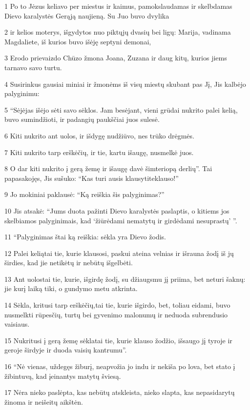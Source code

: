 \par 1 Po to Jėzus keliavo per miestus ir kaimus, pamokslaudamas ir skelbdamas Dievo karalystės Gerąją naujieną. Su Juo buvo dvylika 
\par 2 ir kelios moterys, išgydytos nuo piktųjų dvasių bei ligų: Marija, vadinama Magdaliete, iš kurios buvo išėję septyni demonai, 
\par 3 Erodo prievaizdo Chūzo žmona Joana, Zuzana ir daug kitų, kurios jiems tarnavo savo turtu. 
\par 4 Susirinkus gausiai miniai ir žmonėms iš visų miestų skubant pas Jį, Jis kalbėjo palyginimu: 
\par 5 “Sėjėjas išėjo sėti savo sėklos. Jam besėjant, vieni grūdai nukrito palei kelią, buvo sumindžioti, ir padangių paukščiai juos sulesė. 
\par 6 Kiti nukrito ant uolos, ir išdygę nudžiūvo, nes trūko drėgmės. 
\par 7 Kiti nukrito tarp erškėčių, ir tie, kartu išaugę, nusmelkė juos. 
\par 8 O dar kiti nukrito į gerą žemę ir išaugę davė šimteriopą derlių”. Tai papasakojęs, Jis sušuko: “Kas turi ausis klausyti­teklauso!” 
\par 9 Jo mokiniai paklausė: “Ką reiškia šis palyginimas?” 
\par 10 Jis atsakė: “Jums duota pažinti Dievo karalystės paslaptis, o kitiems jos skelbiamos palyginimais, kad ‘žiūrėdami nematytų ir girdėdami nesuprastų’ ”. 
\par 11 “Palyginimas štai ką reiškia: sėkla yra Dievo žodis. 
\par 12 Palei kelią­tai tie, kurie klausosi, paskui ateina velnias ir išrauna žodį iš jų širdies, kad jie netikėtų ir nebūtų išgelbėti. 
\par 13 Ant uolos­tai tie, kurie, išgirdę žodį, su džiaugsmu jį priima, bet neturi šaknų: jie kurį laiką tiki, o gundymo metu atkrinta. 
\par 14 Sėkla, kritusi tarp erškėčių,­tai tie, kurie išgirdo, bet, toliau eidami, buvo nusmelkti rūpesčių, turtų bei gyvenimo malonumų ir neduoda subrendusio vaisiaus. 
\par 15 Nukritusi į gerą žemę sėkla­tai tie, kurie klauso žodžio, išsaugo jį tyroje ir geroje širdyje ir duoda vaisių kantrumu”. 
\par 16 “Nė vienas, uždegęs žiburį, neapvožia jo indu ir nekiša po lova, bet stato į žibintuvą, kad įeinantys matytų šviesą. 
\par 17 Nėra nieko paslėpta, kas nebūtų atskleista, nieko slapta, kas nepasidarytų žinoma ir neišeitų aikštėn. 
